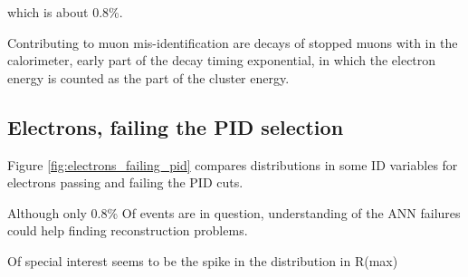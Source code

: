 which is about 0.8\%.

Contributing to muon mis-identification are decays of stopped muons with in the calorimeter, 
early part of the decay timing exponential, in which the electron energy is counted as the part 
of the cluster energy. 



\subsection { Electrons, failing the PID selection} 

Figure \ref{fig:electrons_failing_pid} compares distributions in some ID variables for electrons 
passing and failing the PID cuts.

Although only 0.8\% Of events are in question, understanding of the ANN failures could help finding 
reconstruction problems.

Of special interest seems to be the spike in the distribution in R(max)

